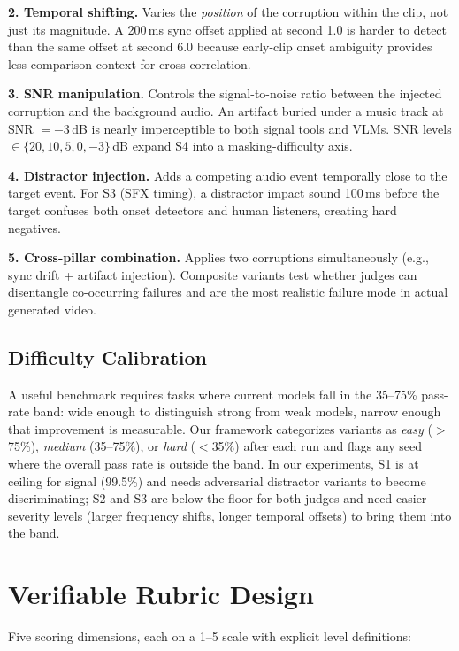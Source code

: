 \documentclass[11pt]{article}
\begin{document}
\textbf{2. Temporal shifting.} Varies the \emph{position} of the corruption within the clip,
not just its magnitude. A 200\,ms sync offset applied at second 1.0 is harder to detect than
the same offset at second 6.0 because early-clip onset ambiguity provides less comparison
context for cross-correlation.

\textbf{3. SNR manipulation.} Controls the signal-to-noise ratio between the injected
corruption and the background audio. An artifact buried under a music track at SNR $= -3$\,dB
is nearly imperceptible to both signal tools and VLMs. SNR levels $\in \{20, 10, 5, 0, -3\}$\,dB
expand S4 into a masking-difficulty axis.

\textbf{4. Distractor injection.} Adds a competing audio event temporally close to the
target event. For S3 (SFX timing), a distractor impact sound 100\,ms before the target
confuses both onset detectors and human listeners, creating hard negatives.

\textbf{5. Cross-pillar combination.} Applies two corruptions simultaneously (e.g., sync
drift + artifact injection). Composite variants test whether judges can disentangle
co-occurring failures and are the most realistic failure mode in actual generated video.

\subsection{Difficulty Calibration}

A useful benchmark requires tasks where current models fall in the 35--75\% pass-rate band:
wide enough to distinguish strong from weak models, narrow enough that improvement is
measurable. Our framework categorizes variants as \emph{easy} ($>$75\%), \emph{medium}
(35--75\%), or \emph{hard} ($<$35\%) after each run and flags any seed where the overall
pass rate is outside the band. In our experiments, S1 is at ceiling for signal (99.5\%)
and needs adversarial distractor variants to become discriminating; S2 and S3 are below
the floor for both judges and need easier severity levels (larger frequency shifts, longer
temporal offsets) to bring them into the band.

\section{Verifiable Rubric Design}

Five scoring dimensions, each on a 1--5 scale with explicit level definitions:
\end{document}

